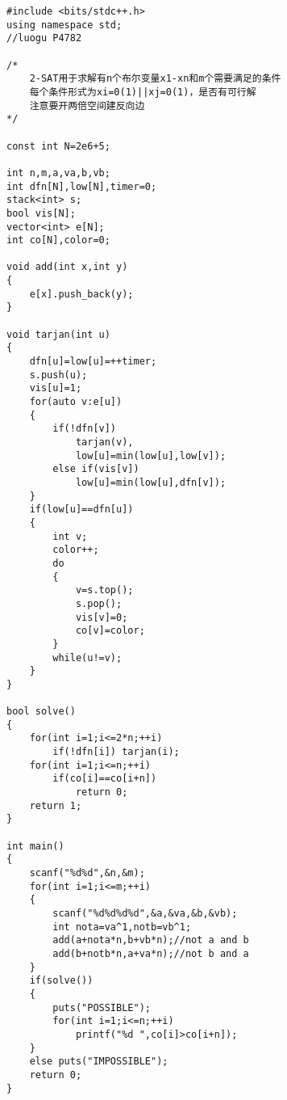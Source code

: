 \begin{lstlisting}
#include <bits/stdc++.h>
using namespace std;
//luogu P4782

/*
	2-SAT用于求解有n个布尔变量x1-xn和m个需要满足的条件
	每个条件形式为xi=0(1)||xj=0(1)，是否有可行解
	注意要开两倍空间建反向边
*/

const int N=2e6+5;

int n,m,a,va,b,vb;
int dfn[N],low[N],timer=0;
stack<int> s;
bool vis[N];
vector<int> e[N];
int co[N],color=0;

void add(int x,int y)
{
	e[x].push_back(y);
}

void tarjan(int u)
{
	dfn[u]=low[u]=++timer;
	s.push(u);
	vis[u]=1;
	for(auto v:e[u])
	{
		if(!dfn[v])
			tarjan(v),
			low[u]=min(low[u],low[v]);
		else if(vis[v])
			low[u]=min(low[u],dfn[v]);
	}
	if(low[u]==dfn[u])
	{
		int v;
		color++;
		do
		{
			v=s.top();
			s.pop();
			vis[v]=0;
			co[v]=color;
		}
		while(u!=v);
	}
}

bool solve()
{
	for(int i=1;i<=2*n;++i)
		if(!dfn[i]) tarjan(i);
	for(int i=1;i<=n;++i)
		if(co[i]==co[i+n])
			return 0;
	return 1;
}

int main()
{
	scanf("%d%d",&n,&m);
	for(int i=1;i<=m;++i)
	{
		scanf("%d%d%d%d",&a,&va,&b,&vb);
		int nota=va^1,notb=vb^1;
		add(a+nota*n,b+vb*n);//not a and b
		add(b+notb*n,a+va*n);//not b and a
	}
	if(solve())
	{
		puts("POSSIBLE");
		for(int i=1;i<=n;++i)
			printf("%d ",co[i]>co[i+n]);
	}
	else puts("IMPOSSIBLE");
	return 0;
}
\end{lstlisting}